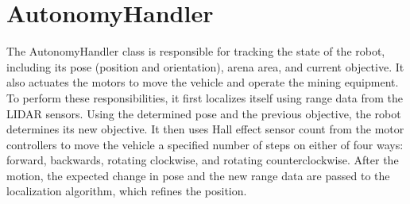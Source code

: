 \section{AutonomyHandler}
The AutonomyHandler class is responsible for tracking the state of the robot, including its pose (position and orientation), arena area, and current objective.  It also actuates the motors to move the vehicle and operate the mining equipment.  To perform these responsibilities, it first localizes itself using range data from the LIDAR sensors.  Using the determined pose and the previous objective, the robot determines its new objective.  It then uses Hall effect sensor count from the motor controllers to move the vehicle a specified number of steps on either of four ways: forward, backwards, rotating clockwise, and rotating counterclockwise.  After the motion, the expected change in pose and the new range data are passed to the localization algorithm, which refines the position.
